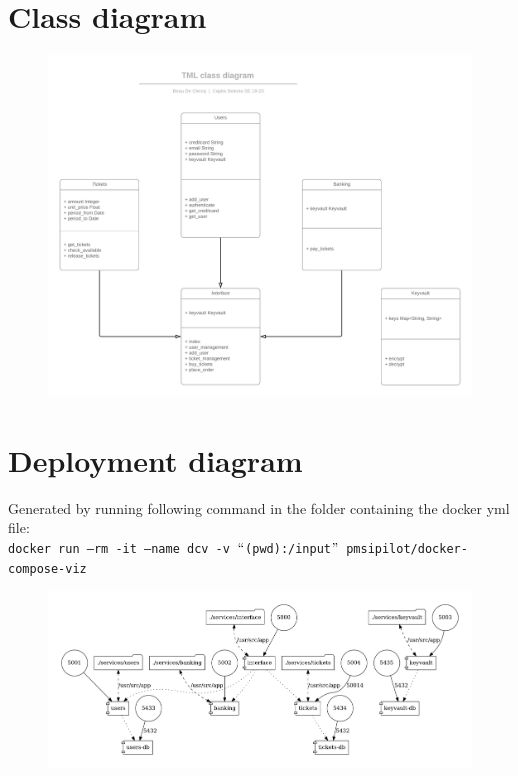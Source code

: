 \documentclass[conference]{IEEEtran}
\begin{document}
\newpage
\clearpage
\newpage
\begin{appendices}
	\section{Class diagram}
	\begin{figure}[h]
		\includegraphics*[scale=0.7]{diagrams/class-diagram.png}
	\end{figure}
	
	\clearpage
	\newpage
	
	\section{Deployment diagram}
	Generated by running following command in the folder containing the docker yml file: \\
	\texttt{docker run --rm -it --name dcv -v $``$(pwd):/input$"$ pmsipilot/docker-compose-viz}\\
	\begin{figure}[h]
		\includegraphics*[scale=0.3]{diagrams/docker-compose.png}
	\end{figure}
	

\end{appendices}
\end{document}
